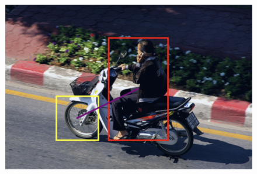\begin{figure}[h!]
{\begin{minipage}[t]{5cm}
			\includegraphics[width=0.9\linewidth]{figures/motor/man2}
			\label{fig:motor_man1}
	\end{minipage}}


\end{figure}
